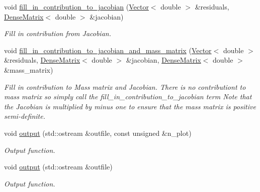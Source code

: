 \begin{DoxyCompactItemize}
void \hyperlink{classoomph_1_1FSIImposeDisplacementByLagrangeMultiplierElement_a48006d22e0ad79703914c687390150b8}{fill\+\_\+in\+\_\+contribution\+\_\+to\+\_\+jacobian} (\hyperlink{classoomph_1_1Vector}{Vector}$<$ double $>$ \&residuals, \hyperlink{classoomph_1_1DenseMatrix}{Dense\+Matrix}$<$ double $>$ \&jacobian)
\begin{DoxyCompactList}\small\item\em Fill in contribution from Jacobian. \end{DoxyCompactList}\item 
void \hyperlink{classoomph_1_1FSIImposeDisplacementByLagrangeMultiplierElement_a7a8efac16a0f0db829372e0d52bf750f}{fill\+\_\+in\+\_\+contribution\+\_\+to\+\_\+jacobian\+\_\+and\+\_\+mass\+\_\+matrix} (\hyperlink{classoomph_1_1Vector}{Vector}$<$ double $>$ \&residuals, \hyperlink{classoomph_1_1DenseMatrix}{Dense\+Matrix}$<$ double $>$ \&jacobian, \hyperlink{classoomph_1_1DenseMatrix}{Dense\+Matrix}$<$ double $>$ \&mass\+\_\+matrix)
\begin{DoxyCompactList}\small\item\em Fill in contribution to Mass matrix and Jacobian. There is no contributiont to mass matrix so simply call the fill\+\_\+in\+\_\+contribution\+\_\+to\+\_\+jacobian term Note that the Jacobian is multiplied by minus one to ensure that the mass matrix is positive semi-\/definite. \end{DoxyCompactList}\item 
void \hyperlink{classoomph_1_1FSIImposeDisplacementByLagrangeMultiplierElement_a473fab5e393ea6faa6d0939128660b0c}{output} (std\+::ostream \&outfile, const unsigned \&n\+\_\+plot)
\begin{DoxyCompactList}\small\item\em Output function. \end{DoxyCompactList}\item 
void \hyperlink{classoomph_1_1FSIImposeDisplacementByLagrangeMultiplierElement_af225163a1513116ea3ffae7b467068f6}{output} (std\+::ostream \&outfile)
\begin{DoxyCompactList}\small\item\em Output function. \end{DoxyCompactList}\end{DoxyCompactItemize}
